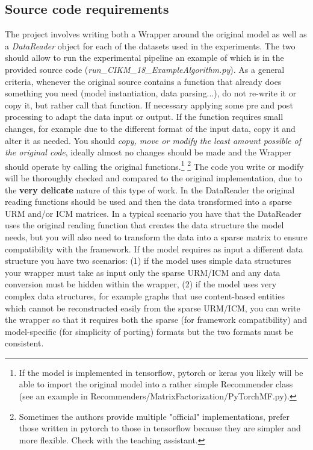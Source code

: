 \documentclass[a4paper]{article}
\begin{document}
\subsection{Source code requirements}
The project involves writing both a Wrapper around the original model as well as a \emph{DataReader} object for each of the datasets used in the experiments. The two should allow to run the experimental pipeline an example of which is in the provided source code (\emph{run\_CIKM\_18\_ExampleAlgorithm.py}).
As a general criteria, whenever the original source contains a function that already does something you need (model instantiation, data parsing...), do not re-write it or copy it, but rather call that function. If necessary applying some pre and post processing to adapt the data input or output. If the function requires small changes, for example due to the different format of the input data, copy it and alter it as needed. You should \emph{copy, move or modify the least amount possible of the original code}, ideally almost no changes should be made and the Wrapper should operate by calling the original functions.\footnote{If the model is implemented in tensorflow, pytorch or keras you likely will be able to import the original model into a rather simple Recommender class (see an example in Recommenders/MatrixFactorization/PyTorchMF.py).} \footnote{Sometimes the authors provide multiple "official" implementations, prefer those written in pytorch to those in tensorflow because they are simpler and more flexible. Check with the teaching assistant.} The code you write or modify will be thoroughly checked and compared to the original implementation, due to the \textbf{very delicate} nature of this type of work. In the DataReader the original reading functions should be used and then the data transformed into a sparse URM and/or ICM matrices. 
In a typical scenario you have that the DataReader uses the original reading function that creates the data structure the model needs, but you will also need to transform the data into a sparse matrix to ensure compatibility with the framework. If the model requires as input a different data structure you have two scenarios: (1) if the model uses simple data structures your wrapper must take as input only the sparse URM/ICM and any data conversion must be hidden within the wrapper, (2) if the model uses very complex data structures, for example graphs that use content-based entities which cannot be reconstructed easily from the sparse URM/ICM, you can write the wrapper so that it requires both the sparse (for framework compatibility) and model-specific (for simplicity of porting) formats but the two formats must be consistent.
\end{document}
